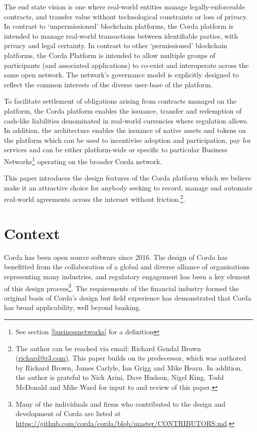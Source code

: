 \documentclass{article}
\begin{document}
The end state vision is one where real-world entities manage legally-enforceable contracts, and transfer value without technological constraints or loss of privacy. In contrast to `unpermissioned' blockchain platforms, the Corda platform is intended to manage real-world transactions between identifiable parties, with privacy and legal certainty. In contrast to other `permissioned' blockchain platforms, the Corda Platform is intended to allow multiple groups of participants (and associated applications) to co-exist and interoperate across the same open network. The network's governance model is explicitly designed to reflect the common interests of the diverse user-base of the platform.

To facilitate settlement of obligations arising from contracts managed on the platform, the Corda platform enables the issuance, transfer and redemption of cash-like liabilities denominated in real-world currencies where regulation allows. In addition, the architecture enables the issuance of native assets and tokens on the platform which can be used to incentivise adoption and participation, pay for services and can be either platform-wide or specific to particular Business Networks\footnote{See section \ref{businessnetworks} for a definition} operating on the broader Corda network.

This paper introduces the design features of the Corda platform which we believe make it an attractive choice for anybody seeking to record, manage and automate real-world agreements across the internet without friction.\footnote{The author can be reached via email: Richard Gendal Brown \href{mailto:richard@r3.com}{(richard@r3.com)}. This paper builds on its predecessor, which was  authored by Richard Brown, James Carlyle, Ian Grigg and Mike Hearn. In addition, the author is grateful to Nick Arini, Dave Hudson, Nigel King, Todd McDonald and Mike Ward for input to and review of this paper.}.

\section{Context}
Corda has been open source software since 2016. The design of Corda has benefitted from the collaboration of a global and diverse alliance of organisations representing many industries, and regulatory engagement has been a key element of this design process\footnote{Many of the individuals and firms who contributed to the design and development of Corda are listed at \url{https://github.com/corda/corda/blob/master/CONTRIBUTORS.md}.}. The requirements of the financial industry formed the original basis of Corda's design but field experience has demonstrated that Corda has broad applicability, well beyond banking.
\end{document}
